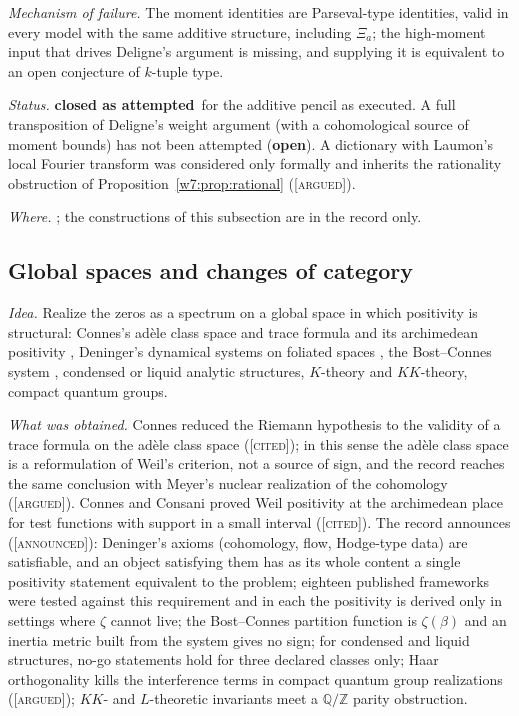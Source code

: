 \documentclass[11pt]{amsart}
\theoremstyle{definition}
\theoremstyle{remark}
\numberwithin{equation}{section}
\newcommand{\Z}{\mathbb{Z}}
\newcommand{\Q}{\mathbb{Q}}
\newcommand{\stag}[1]{\textsc{[#1]}}
\newcommand{\CITED}{\stag{cited}}
\newcommand{\ARGUED}{\stag{argued}}
\newcommand{\ANNOUNCED}{\stag{announced}}
\newcommand{\rtag}[1]{\textbf{\small\textsf{#1}}}
\newcommand{\closedA}{\rtag{closed as attempted}}
\newcommand{\openR}{\rtag{open}}
\newcommand{\entry}[1]{\par\smallskip\noindent\textit{#1.}\enspace}
\begin{document}
\entry{Mechanism of failure} The moment identities are Parseval-type identities, valid in every model with
the same additive structure, including $\Xi_a$; the high-moment input that drives Deligne's argument is
missing, and supplying it is equivalent to an open conjecture of $k$-tuple type.

\entry{Status} \closedA\ for the additive pencil as executed. A full transposition of Deligne's weight
argument (with a cohomological source of moment bounds) has not been attempted (\openR). A dictionary with
Laumon's local Fourier transform \cite{Laumon1987} was considered only formally and inherits the rationality obstruction of
Proposition~\ref{w7:prop:rational} (\ARGUED).

\entry{Where} \cite{Deligne1974,Laumon1987}; the constructions of this subsection are in the record only.

\subsection{Global spaces and changes of category}\label{w7:fam:R23}

\entry{Idea} Realize the zeros as a spectrum on a global space in which positivity is structural: Connes's
ad\`ele class space and trace formula \cite{Connes1999} and its archimedean positivity \cite{ConnesConsani2021},
Deninger's dynamical systems on foliated spaces \cite{Deninger1998}, the Bost--Connes system \cite{BostConnes1995},
condensed or liquid analytic structures, $K$-theory and $KK$-theory, compact quantum groups.

\entry{What was obtained} Connes reduced the Riemann hypothesis to the validity of a trace formula on the ad\`ele
class space \cite{Connes1999} (\CITED); in this sense the ad\`ele class space is a reformulation of Weil's
criterion, not a source of sign, and the record reaches the same conclusion with Meyer's nuclear realization of
the cohomology (\ARGUED). Connes and Consani proved Weil positivity at the archimedean place for test functions
with support in a small interval \cite{ConnesConsani2021} (\CITED). The record announces (\ANNOUNCED): Deninger's
axioms (cohomology, flow, Hodge-type data) are satisfiable, and an object satisfying them has as its whole content a
single positivity statement equivalent to the problem; eighteen published frameworks were tested against this
requirement and in each the positivity is derived only in settings where $\zeta$ cannot live; the Bost--Connes
partition function is $\zeta(\beta)$ and an inertia metric built from the system gives no sign; for condensed and
liquid structures, no-go statements hold for three declared classes only; Haar orthogonality kills the
interference terms in compact quantum group realizations (\ARGUED); $KK$- and $L$-theoretic invariants meet a
$\Q/\Z$ parity obstruction.
\end{document}
